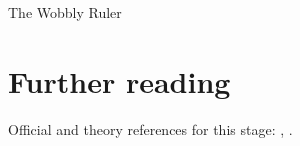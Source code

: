 \begin{ledger}{The Wobbly Ruler}
\end{ledger}

\section{Further reading}
\label{sec:wobbly_ruler:further_reading}
Official and theory references for this stage: \cite{CMS:2016lmd}, \cite{CMS:2011krm}.

\begin{pitfalls}
\end{pitfalls}

\begin{exercises}
\item {}
\item {}
\end{exercises}
